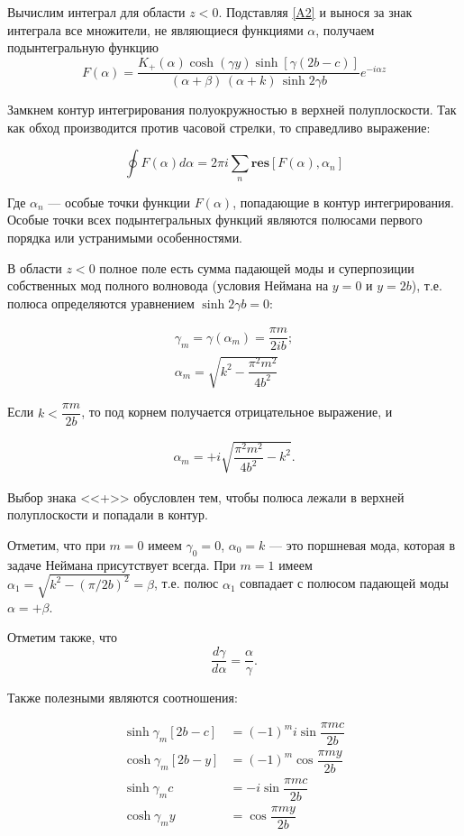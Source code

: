 \documentclass[a4paper,12pt]{article}
\begin{document}
Вычислим интеграл для области $z<0$. Подставляя \ref{A2} и вынося за знак интеграла все множители, не являющиеся функциями $\alpha$, получаем подынтегральную функцию
$$ F(\alpha) = \dfrac{K_+(\alpha)\cosh(\gamma y) \sinh[\gamma (2b-c)] }{(\alpha + \beta)\,(\alpha + k)\,\sinh{2\gamma b}} e^{-i\alpha z}$$

Замкнем контур интегрирования полуокружностью в верхней полуплоскости. Так как обход производится против часовой стрелки, то справедливо выражение:

\begin{equation}
     \oint F(\alpha) d \alpha = 2 \pi i \sum_n \textbf{res}[F(\alpha), \alpha_n]
\end{equation}

Где $\alpha_n$ --- особые точки функции $F(\alpha)$, попадающие в контур интегрирования. Особые точки всех подынтегральных функций являются полюсами первого порядка или устранимыми особенностями.

В области $z<0$ полное поле есть сумма падающей моды и суперпозиции собственных мод полного волновода (условия Неймана на $y=0$ и $y=2b$), т.е. полюса определяются уравнением $\sinh 2\gamma b = 0$:

\begin{gather}
    \gamma_m = \gamma(\alpha_m) = \dfrac{\pi m}{2 i b}; \\
    \alpha_m = \sqrt{k^2 - \dfrac{\pi^2 m^2}{4 b^2}}
\end{gather}

Если $k < \dfrac{\pi m}{2b}$, то под корнем получается отрицательное выражение, и

\begin{gather}
    \alpha_m = +i\sqrt{ \dfrac{\pi^2 m^2}{4 b^2} - k^2}.
\end{gather}

Выбор знака <<+>> обусловлен тем, чтобы полюса лежали в верхней полуплоскости и попадали в контур.

Отметим, что при $m=0$ имеем $\gamma_0 = 0$, $\alpha_0 = k$ --- это поршневая мода, которая в задаче Неймана присутствует всегда. При $m=1$ имеем $\alpha_1 = \sqrt{k^2 - (\pi/2b)^2} = \beta$, т.е. полюс $\alpha_1$ совпадает с полюсом падающей моды $\alpha = +\beta$.

Отметим также, что $$\dfrac{d\gamma}{d\alpha} = \dfrac{\alpha}{\gamma}.$$

Также полезными являются соотношения:

\begin{align}
    \sinh{\gamma_m[2b - c]} &= (-1)^m i \sin{\dfrac{\pi m c}{2 b}} \\
    \cosh{\gamma_m[2b - y]} &= (-1)^m \cos{\dfrac{\pi m y}{2 b}} \\
    \sinh{\gamma_m c} &= -i \sin{\dfrac{\pi m c}{2 b}}\\
     \cosh{\gamma_m y} &= \cos{\dfrac{\pi m y}{2 b}} 
\end{align}
\end{document}
